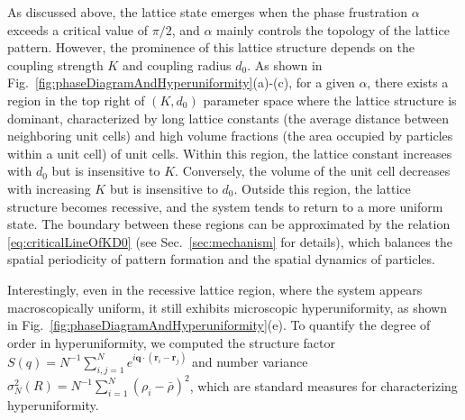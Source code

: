 \documentclass{article}
\begin{document}
As discussed above, the lattice state emerges when the phase frustration $\alpha$ exceeds a critical value of $\pi/2$, and $\alpha$ mainly controls the topology of the lattice pattern.
However, the prominence of this lattice structure depends on the coupling strength $K$ and coupling radius $d_0$.
As shown in Fig.~\ref{fig:phaseDiagramAndHyperuniformity}(a)-(c), for a given $\alpha$, there exists a region in the top right of $(K, d_0)$ parameter space where the lattice structure is dominant, characterized by long lattice constants (the average distance between neighboring unit cells) and high volume fractions (the area occupied by particles within a unit cell) of unit cells.
Within this region, the lattice constant increases with $d_0$ but is insensitive to $K$. Conversely, the volume of the unit cell decreases with increasing $K$ but is insensitive to $d_0$.
Outside this region, the lattice structure becomes recessive, and the system tends to return to a more uniform state. The boundary between these regions can be approximated by the relation \eqref{eq:criticalLineOfKD0} (see Sec.~\ref{sec:mechanism} for details), which balances the spatial periodicity of pattern formation and the spatial dynamics of particles.

Interestingly, even in the recessive lattice region, where the system appears macroscopically uniform, it still exhibits microscopic hyperuniformity, as shown in Fig.~\ref{fig:phaseDiagramAndHyperuniformity}(e).
To quantify the degree of order in hyperuniformity, we computed the structure factor $S(q)=N^{-1}\sum_{i,j=1}^{N}e^{i\mathbf{q}\cdot(\mathbf{r}_i-\mathbf{r}_j)}$ and number variance $\sigma _N^2(R)=N^{-1}\sum_{i=1}^{N}(\rho _i-\bar{\rho})^2$, which are standard measures for characterizing hyperuniformity\cite{TORQUATO20181}. 


\end{document}
